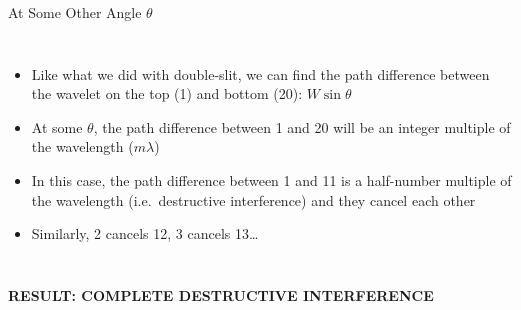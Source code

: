 \documentclass[compress,aspectratio=169]{beamer}
\begin{document}
\begin{frame}{At Some Other Angle $\theta$}
  \begin{columns}
    
    \begin{itemize}
    \item Like what we did with double-slit, we can find the path
      difference between the wavelet on the top (1) and bottom
      (20): $W\sin\theta$
    \item At some $\theta$, the path difference between 1 and 20 will be an
      integer multiple of the wavelength ($m\lambda$)
    \item In this case, the path difference between 1 and 11 is
      a half-number multiple of the wavelength (i.e.\ destructive
      interference) and they cancel each other
    \item Similarly, 2 cancels 12, 3 cancels 13\ldots
    \end{itemize}

  \end{columns}

  \vspace{0.1in}\textbf{RESULT: COMPLETE DESTRUCTIVE INTERFERENCE}
\end{frame}
\end{document}
